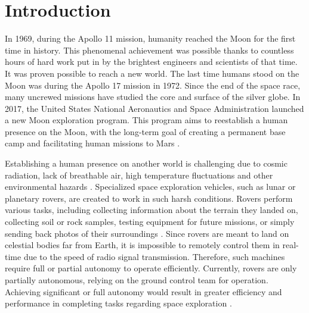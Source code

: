 \documentclass[a4paper,twoside,12pt]{book}
\begin{document}
\cleardoublepage

\pagestyle{PageNumbersChapterTitles}


\chapter{Introduction}
In 1969, during the Apollo 11 mission, humanity reached the Moon for the first time in history. This phenomenal achievement was possible thanks to countless hours of hard work put in by the brightest engineers and scientists of that time. It was proven possible to reach a new world. The last time humans stood on the Moon was during the Apollo 17 mission in 1972. Since the end of the space race, many uncrewed missions have studied the core and surface of the silver globe. In 2017, the United States National Aeronautics and Space Administration launched a new Moon exploration program. This program aims to reestablish a human presence on the Moon, with the long-term goal of creating a permanent base camp and facilitating human missions to Mars \cite{smith2020artemis}.

Establishing a human presence on another world is challenging due to cosmic radiation, lack of breathable air, high temperature fluctuations and other environmental hazards \cite{Yakubovskiy:2019} \cite{latch2008toxicity}. Specialized space exploration vehicles, such as lunar or planetary rovers, are created to work in such harsh conditions. Rovers perform various tasks, including collecting information about the terrain they landed on, collecting soil or rock samples, testing equipment for future missions, or simply sending back photos of their surroundings \cite{bajracharya2008autonomy}.  Since rovers are meant to land on celestial bodies far from Earth, it is impossible to remotely control them in real-time due to the speed of radio signal transmission. Therefore, such machines require full or partial autonomy to operate efficiently. Currently, rovers are only partially autonomous, relying on the ground control team for operation. Achieving significant or full autonomy would result in greater efficiency and performance in completing tasks regarding space exploration \cite{chien2006future}.
\end{document}
